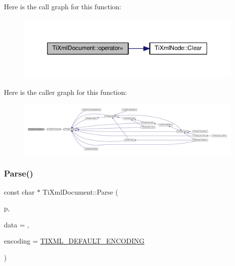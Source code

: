 Here is the call graph for this function\+:
\nopagebreak
\begin{figure}[H]
\begin{center}
\leavevmode
\includegraphics[width=345pt]{class_ti_xml_document_aa56fd4dbe8917d2033d865909e2d737e_cgraph}
\end{center}
\end{figure}
Here is the caller graph for this function\+:
\nopagebreak
\begin{figure}[H]
\begin{center}
\leavevmode
\includegraphics[width=350pt]{class_ti_xml_document_aa56fd4dbe8917d2033d865909e2d737e_icgraph}
\end{center}
\end{figure}
\mbox{\label{class_ti_xml_document_a789ad2f06f93d52bdb5570b2f3670289}} 
\subsubsection{\texorpdfstring{Parse()}{Parse()}}
{\footnotesize\ttfamily const char $\ast$ Ti\+Xml\+Document\+::\+Parse (\begin{DoxyParamCaption}\item[{const char $\ast$}]{p,  }\item[{\hyperlink{class_ti_xml_parsing_data}{Ti\+Xml\+Parsing\+Data} $\ast$}]{data = {},  }\item[{\hyperlink{tinyxml_8h_a88d51847a13ee0f4b4d320d03d2c4d96}{Ti\+Xml\+Encoding}}]{encoding = {\ttfamily \hyperlink{tinyxml_8h_ad5b8b092878e9010d6400cb6c13d4879}{T\+I\+X\+M\+L\+\_\+\+D\+E\+F\+A\+U\+L\+T\+\_\+\+E\+N\+C\+O\+D\+I\+NG}} }\end{DoxyParamCaption})\hspace{0.3cm}{\ttfamily [virtual]}}

